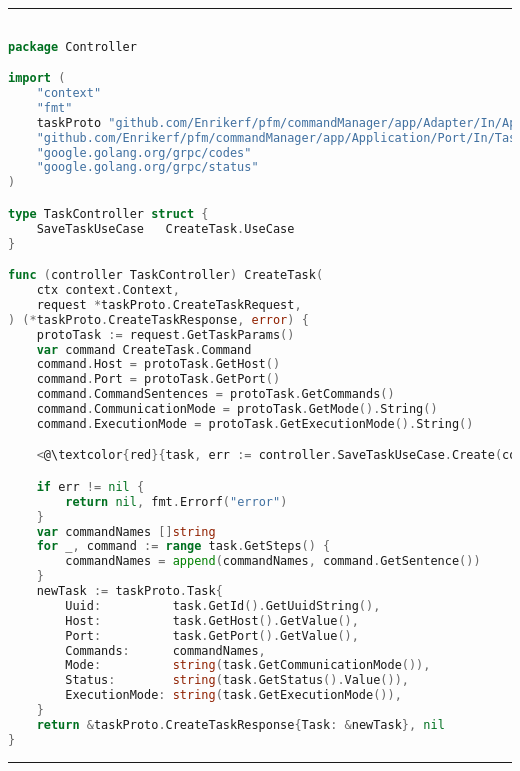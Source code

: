 
\phantom{blank}
\vspace{5mm}
\hrule
\begin{lstlisting}[language=Go,caption={TaskController.go},breaklines=true,label={lst:TaskControler}]

package Controller

import (
	"context"
	"fmt"
	taskProto "github.com/Enrikerf/pfm/commandManager/app/Adapter/In/ApiGrcp/gen/task"
	"github.com/Enrikerf/pfm/commandManager/app/Application/Port/In/Task/CreateTask"
	"google.golang.org/grpc/codes"
	"google.golang.org/grpc/status"
)

type TaskController struct {
	SaveTaskUseCase   CreateTask.UseCase
}

func (controller TaskController) CreateTask(
	ctx context.Context,
	request *taskProto.CreateTaskRequest,
) (*taskProto.CreateTaskResponse, error) {
	protoTask := request.GetTaskParams()
	var command CreateTask.Command
	command.Host = protoTask.GetHost()
	command.Port = protoTask.GetPort()
	command.CommandSentences = protoTask.GetCommands()
	command.CommunicationMode = protoTask.GetMode().String()
	command.ExecutionMode = protoTask.GetExecutionMode().String()

    <@\textcolor{red}{task, err := controller.SaveTaskUseCase.Create(command)}@>

	if err != nil {
		return nil, fmt.Errorf("error")
	}
	var commandNames []string
	for _, command := range task.GetSteps() {
		commandNames = append(commandNames, command.GetSentence())
	}
	newTask := taskProto.Task{
		Uuid:          task.GetId().GetUuidString(),
		Host:          task.GetHost().GetValue(),
		Port:          task.GetPort().GetValue(),
		Commands:      commandNames,
		Mode:          string(task.GetCommunicationMode()),
		Status:        string(task.GetStatus().Value()),
		ExecutionMode: string(task.GetExecutionMode()),
	}
	return &taskProto.CreateTaskResponse{Task: &newTask}, nil
}

\end{lstlisting}
\hrule